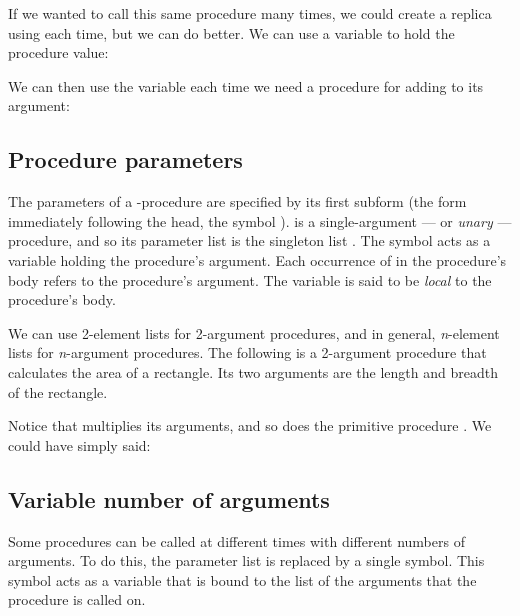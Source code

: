 
If we wanted to call this same procedure many times, we
could create a replica using  each time, but
we can do better.   We can use a variable to hold the
procedure value:


We can then use the variable  each time we need
a procedure for adding  to its argument:


\subsection{Procedure parameters}

The parameters of a -procedure are specified
by its first subform (the form immediately following
the head, the symbol ).  
is a single-argument --- or {\em unary} --- procedure, and so its parameter
list is the singleton list .  The symbol 
acts as a variable holding the procedure's argument.
Each occurrence of  in the procedure's body refers
to the procedure's argument.  The variable  is
said to be {\em local} to the procedure's body.

We can use 2-element lists for 2-argument procedures,
and in general, {\em n}-element lists for {\em
n}-argument procedures.  The following is a 2-argument
procedure that calculates the area of a rectangle.  Its
two arguments are the length and breadth of the
rectangle.


Notice that  multiplies its arguments, and so
does the primitive procedure \q{*}.  We could have
simply said:


\subsection{Variable number of arguments}

Some procedures can be called at different times with
different numbers of arguments.  To do this, the
 parameter list is replaced by a single
symbol.  This symbol acts as a variable that is bound
to the list of the arguments that the procedure is
called on.

